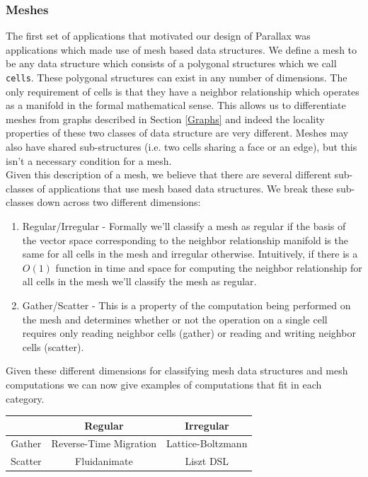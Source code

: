 \documentclass{article}
\theoremstyle{definition}
\begin{document}
\subsubsection{Meshes \label{Mesh}}
\noindent
The first set of applications that motivated our design of Parallax was 
applications which made use of mesh based data structures.  We define a mesh
to be any data structure which consists of a polygonal structures which we
call {\tt cells}.  These polygonal structures can exist in any number of dimensions.
The only requirement of cells is that they have a neighbor relationship which
operates as a manifold in the formal mathematical sense.  This allows us
to differentiate meshes from graphs described in Section \ref{Graphs} and indeed
the locality properties of these two classes of data structure are very 
different.  Meshes may also have shared sub-structures (i.e. two cells sharing
a face or an edge), but this isn't a necessary condition for a mesh. \\

\noindent
Given this description of a mesh, we believe that there are several different
sub-classes of applications that use mesh based data structures.  We break
these sub-classes down across two different dimensions:

\begin{enumerate}
\item Regular/Irregular - Formally we'll classify a mesh as regular if the basis
of the vector space corresponding to the neighbor relationship manifold is the same
for all cells in the mesh and irregular otherwise.  Intuitively, if there is 
a $O(1)$ function in time and space for computing the neighbor relationship for 
all cells in the mesh we'll classify the mesh as regular.
\item Gather/Scatter - This is a property of the computation being performed on
the mesh and determines whether or not the operation on a single cell requires
only reading neighbor cells (gather) or reading and writing neighbor cells (scatter).
\end{enumerate}

\noindent
Given these different dimensions for classifying mesh data structures and mesh
computations we can now give examples of computations that fit in each category.

\begin{center}
\begin{tabular}{|c||c|c|}
\hline
 & Regular & Irregular \\ \hline \hline
Gather & Reverse-Time Migration \cite{Micikevicius09} & Lattice-Boltzmann \cite{Heuveline07} \\ \hline
Scatter & Fluidanimate \cite{Bienia08} & Liszt DSL\cite{DeVito10} \\ \hline
\end{tabular}
\end{center}
\end{document}
